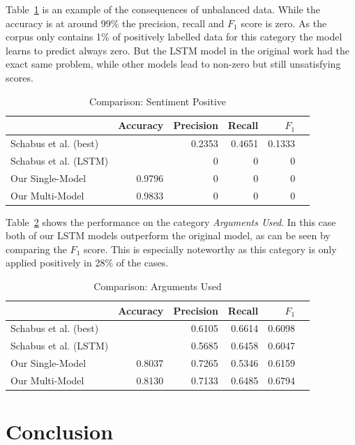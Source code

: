 \documentclass[11pt,a4paper]{article}
\begin{document}
Table~\ref{tab:results:sentiment_positive} is an example of the consequences of unbalanced data. While the accuracy is at around 99\% the precision, recall and $F_1$ score is zero. As the corpus only contains 1\% of positively labelled data for this category the model learns to predict always zero.
But the LSTM model in the original work had the exact same problem, while other models lead to non-zero but still unsatisfying scores.
\begin{table}[h!]
	\centering\scriptsize
	\begin{tabular}{l r r r r r}
		& Accuracy & Precision & Recall & $F_1$ \\
		\hline
		Schabus et al. (best) & & 0.2353 & 0.4651 & 0.1333 \\
		Schabus et al. (LSTM) & & 0 & 0 & 0\\
		\hline
		Our Single-Model & 0.9796 & 0 & 0 & 0 \\
		Our Multi-Model & 0.9833 & 0 & 0 & 0 \\
	\end{tabular}
	\caption{Comparison: Sentiment Positive}
	\label{tab:results:sentiment_positive}
\end{table}

Table~\ref{tab:results:arguments_used} shows the performance on the category \textit{Arguments Used}.
In this case both of our LSTM models outperform the original model, as can be seen by comparing the $F_1$ score.
This is especially noteworthy as this category is only applied positively in 28\% of the cases.  
\begin{table}[h!]
	\centering\scriptsize
	\begin{tabular}{l r r r r r}
		& Accuracy & Precision & Recall & $F_1$ \\
		\hline
		Schabus et al. (best) & & 0.6105 & 0.6614 & 0.6098 \\
		Schabus et al. (LSTM) & & 0.5685 & 0.6458 & 0.6047\\
		\hline
		Our Single-Model & 0.8037 & 0.7265 & 0.5346 & 0.6159 \\
		Our Multi-Model & 0.8130 & 0.7133 & 0.6485 & 0.6794 \\
	\end{tabular}
	\caption{Comparison: Arguments Used}
	\label{tab:results:arguments_used}
\end{table}


\section{Conclusion}





\appendix

\end{document}
